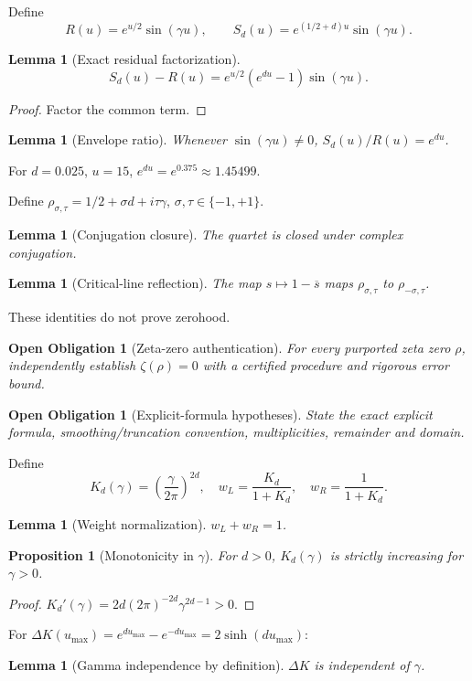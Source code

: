 \documentclass[11pt]{article}
\newtheorem{lemma}[theorem]{Lemma}
\newtheorem{proposition}[theorem]{Proposition}
\newtheorem{obligation}[theorem]{Open Obligation}
\begin{document}
Define
\[
R(u)=e^{u/2}\sin(\gamma u),\qquad S_d(u)=e^{(1/2+d)u}\sin(\gamma u).
\]
\begin{lemma}[Exact residual factorization]
\[
S_d(u)-R(u)=e^{u/2}(e^{du}-1)\sin(\gamma u).
\]
\end{lemma}
\begin{proof}Factor the common term.\end{proof}

\begin{lemma}[Envelope ratio]
Whenever $\sin(\gamma u)\ne0$, $S_d(u)/R(u)=e^{du}$.
\end{lemma}
For $d=0.025$, $u=15$, $e^{du}=e^{0.375}\approx1.45499$.

Define $\rho_{\sigma,\tau}=1/2+\sigma d+i\tau\gamma$, $\sigma,\tau\in\{-1,+1\}$.
\begin{lemma}[Conjugation closure]The quartet is closed under complex conjugation.\end{lemma}
\begin{lemma}[Critical-line reflection]The map $s\mapsto1-\overline{s}$ maps $\rho_{\sigma,\tau}$ to $\rho_{-\sigma,\tau}$.\end{lemma}

These identities do not prove zerohood.

\begin{obligation}[Zeta-zero authentication]
For every purported zeta zero $\rho$, independently establish $\zeta(\rho)=0$ with a certified procedure and rigorous error bound.
\end{obligation}
\begin{obligation}[Explicit-formula hypotheses]
State the exact explicit formula, smoothing/truncation convention, multiplicities, remainder and domain.
\end{obligation}

Define
\[
K_d(\gamma)=\left(\frac{\gamma}{2\pi}\right)^{2d},\quad
w_L=\frac{K_d}{1+K_d},\quad w_R=\frac1{1+K_d}.
\]
\begin{lemma}[Weight normalization]$w_L+w_R=1$.\end{lemma}
\begin{proposition}[Monotonicity in $\gamma$]For $d>0$, $K_d(\gamma)$ is strictly increasing for $\gamma>0$.\end{proposition}
\begin{proof}$K_d'(\gamma)=2d(2\pi)^{-2d}\gamma^{2d-1}>0$.\end{proof}

For $\Delta K(u_{\max})=e^{du_{\max}}-e^{-du_{\max}}=2\sinh(du_{\max})$:
\begin{lemma}[Gamma independence by definition]$\Delta K$ is independent of $\gamma$.\end{lemma}
\end{document}
